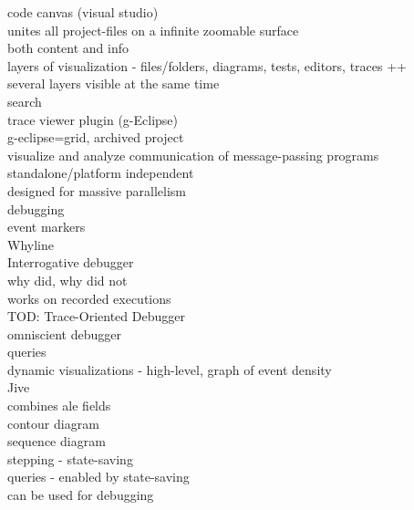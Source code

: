 code canvas (visual studio)\\
	unites all project-files on a infinite zoomable surface\\
	both content and info\\
	layers of visualization - files/folders, diagrams, tests, editors, traces ++\\
	several layers visible at the same time\\
	search\\

trace viewer plugin (g-Eclipse)\\
	g-eclipse=grid, archived project\\
	visualize and analyze communication of message-passing programs\\
	standalone/platform independent\\
	designed for massive parallelism\\
	debugging\\
	event markers\\

Whyline\\
	Interrogative debugger\\
	why did, why did not\\
	works on recorded executions\\

TOD: Trace-Oriented Debugger\\
	omniscient debugger\\
	queries\\
	dynamic visualizations - high-level, graph of event density\\

Jive\\
	combines ale fields\\
	contour diagram\\
	sequence diagram\\
	stepping - state-saving\\
	queries - enabled by state-saving\\
	can be used for debugging\\




